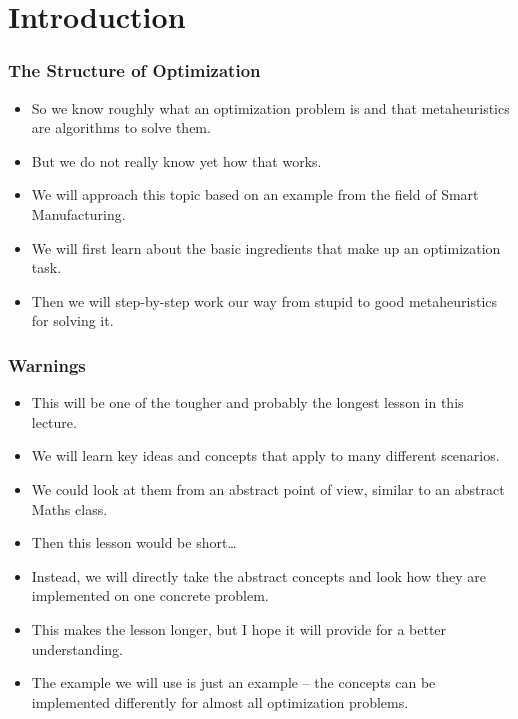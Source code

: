 \documentclass[mathserif]{beamer}%
\subtitle{2. Structure}%
\begin{document}
%
%
\startPresentation%
%
%
\section{Introduction}%
%
\begin{frame}%
\frametitle{The Structure of Optimization}%
\begin{itemize}%
\item So we know roughly what an optimization problem is and that metaheuristics\cite{aitoa,WGOEB,GK2003HOM,MF2004HTSIMH} are algorithms to solve them.%
\item<2-> But we do not really know yet how that works.%
\item<3-> We will approach this topic based on an example from the field of Smart Manufacturing.
\item<4-> We will first learn about the basic ingredients that make up an optimization task.%
\item<5-> Then we will step-by-step work our way from stupid to good metaheuristics for solving it.%
\end{itemize}%
\end{frame}%
%
\begin{frame}%
\frametitle{Warnings}%
\begin{itemize}%
\item This will be one of the tougher and probably the longest lesson in this lecture.%
\item<2-> We will learn key ideas and concepts that apply to many different scenarios.%
\item<3-> We could look at them from an abstract point of view, similar to an abstract Maths class.%
\item<4-> Then this lesson would be short\dots{}%
\item<6-> Instead, we will directly take the abstract concepts and look how they are implemented on one concrete problem.%
\item<7-> This makes the lesson longer, but I hope it will provide for a better understanding.%
\item<8-> The example we will use is \alert{just an example} -- the concepts can be implemented differently for almost all optimization problems.%
\end{itemize}%
\end{frame}%
%
\end{document}
